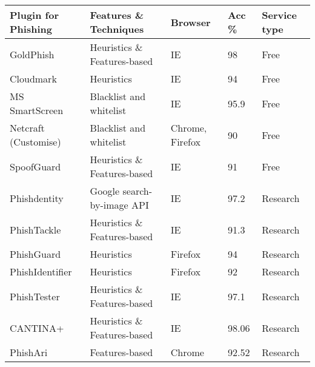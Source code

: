 \begin{singlespace}
	\small
	\begin{center}
		\label{tab:EXISTENT_SOLUTIONS}
		\begin{tabular}{ | m{8em} | m{13em} | m{8.5em} | m{2.3em} | m{5em} | }
			\hline
			\textbf{Plugin for Phishing} & \textbf{Features \& Techniques}       & \textbf{Browser}    & \textbf{Acc \%} & \textbf{Service  type} \\
			\hline
			GoldPhish                    & Heuristics \& Features-based          & IE                  & 98              & Free                   \\
			\hline
			Cloudmark                    & Heuristics                            & IE                  & 94              & Free                   \\
			\hline
			MS SmartScreen               & Blacklist and whitelist               & IE                  & 95.9            & Free                   \\
			\hline
			Netcraft (Customise)         & Blacklist and whitelist               & Chrome, Firefox     & 90              & Free                   \\
			\hline
			SpoofGuard                   & Heuristics \& Features-based          & IE                  & 91              & Free                   \\
			\hline
			Phishdentity                 & Google search-by-image API            & IE                  & 97.2            & Research               \\
			\hline
			PhishTackle                  & Heuristics \& Features-based          & IE                  & 91.3            & Research               \\
			\hline
			PhishGuard                   & Heuristics                            & Firefox             & 94              & Research               \\
			\hline
			PhishIdentifier              & Heuristics                            & Firefox             & 92              & Research               \\
			\hline
			PhishTester                  & Heuristics \& Features-based          & IE                  & 97.1            & Research               \\
			\hline
			CANTINA+                     & Heuristics \& Features-based          & IE                  & 98.06           & Research               \\
			\hline
			PhishAri                     & Features-based                        & Chrome              & 92.52           & Research               \\

\end{tabular}
\end{center}
\end{singlespace}
